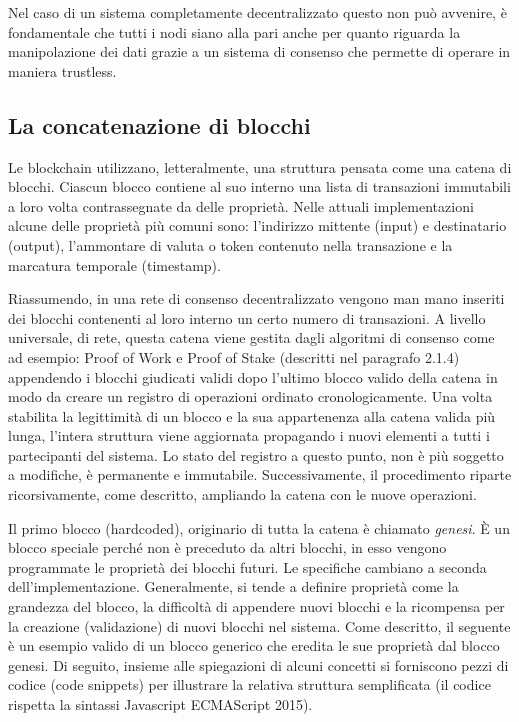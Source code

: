 
Nel caso di un sistema completamente decentralizzato questo non può avvenire, è fondamentale che tutti i nodi siano alla pari anche per quanto riguarda la manipolazione dei dati grazie a un sistema di consenso che permette di operare in maniera trustless. %

\subsection{La concatenazione di blocchi}

Le blockchain utilizzano, letteralmente, una struttura pensata come una catena di blocchi. Ciascun blocco contiene al suo interno una lista di transazioni immutabili a loro volta contrassegnate da delle proprietà. Nelle attuali implementazioni alcune delle proprietà più comuni sono: l’indirizzo mittente (input) e destinatario (output), l’ammontare di valuta o token contenuto nella transazione e la marcatura temporale (timestamp).

Riassumendo, in una rete di consenso decentralizzato vengono man mano inseriti dei blocchi contenenti al loro interno un certo numero di transazioni. A livello universale, di rete, questa catena viene gestita dagli algoritmi di consenso come ad esempio: Proof of Work e Proof of Stake (descritti nel paragrafo 2.1.4) appendendo i blocchi giudicati validi dopo l'ultimo blocco valido della catena in modo da creare un registro di operazioni ordinato cronologicamente. Una volta stabilita la legittimità di un blocco e la sua appartenenza alla catena valida più lunga, l’intera struttura viene aggiornata propagando i nuovi elementi a tutti i partecipanti del sistema. Lo stato del registro a questo punto, non è più soggetto a modifiche, è permanente e immutabile. Successivamente, il procedimento riparte ricorsivamente, come descritto, ampliando la catena con le nuove operazioni.

Il primo blocco \smallskip {} (hardcoded), originario di tutta la catena è chiamato \emph{genesi}. È un blocco speciale perché non è preceduto da altri blocchi, in esso vengono programmate le proprietà dei blocchi futuri. Le specifiche cambiano a seconda dell’implementazione. Generalmente, si tende a definire proprietà come la grandezza del blocco, la difficoltà di appendere nuovi blocchi e la ricompensa per la creazione (validazione) di nuovi blocchi nel sistema. 
Come descritto, il seguente è un esempio valido di un blocco generico che eredita le sue proprietà dal blocco genesi.
Di seguito, insieme alle spiegazioni di alcuni concetti si forniscono pezzi di codice (code snippets) per illustrare la relativa struttura semplificata (il codice rispetta la sintassi Javascript ECMAScript 2015). 
\\

